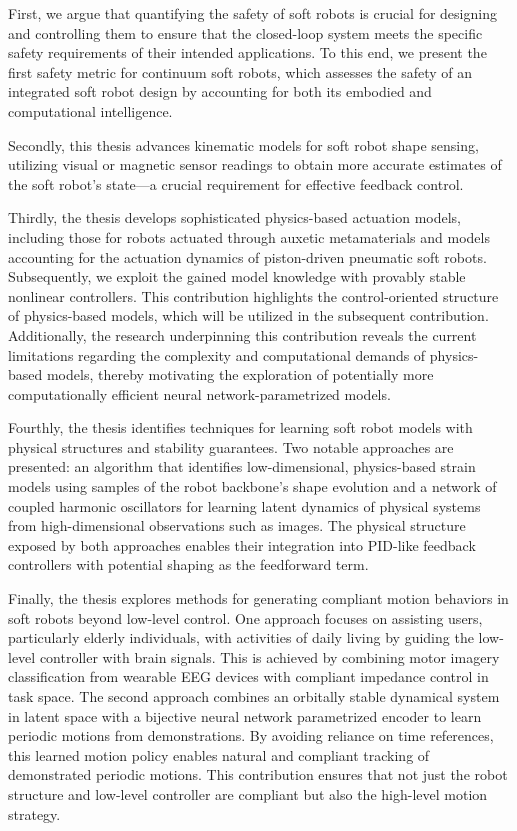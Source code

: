 First, we argue that quantifying the safety of soft robots is crucial for designing and controlling them to ensure that the closed-loop system meets the specific safety requirements of their intended applications. To this end, we present the first safety metric for continuum soft robots, which assesses the safety of an integrated soft robot design by accounting for both its embodied and computational intelligence.

Secondly, this thesis advances kinematic models for soft robot shape sensing, utilizing visual or magnetic sensor readings to obtain more accurate estimates of the soft robot's state—a crucial requirement for effective feedback control. 

Thirdly, the thesis develops sophisticated physics-based actuation models, including those for robots actuated through auxetic metamaterials and models accounting for the actuation dynamics of piston-driven pneumatic soft robots. Subsequently, we exploit the gained model knowledge with provably stable nonlinear controllers.
This contribution highlights the control-oriented structure of physics-based models, which will be utilized in the subsequent contribution. Additionally, the research underpinning this contribution reveals the current limitations regarding the complexity and computational demands of physics-based models, thereby motivating the exploration of potentially more computationally efficient neural network-parametrized models.

Fourthly, the thesis identifies techniques for learning soft robot models with physical structures and stability guarantees. Two notable approaches are presented: an algorithm that identifies low-dimensional, physics-based strain models using samples of the robot backbone's shape evolution and a network of coupled harmonic oscillators for learning latent dynamics of physical systems from high-dimensional observations such as images. The physical structure exposed by both approaches enables their integration into PID-like feedback controllers with potential shaping as the feedforward term.

Finally, the thesis explores methods for generating compliant motion behaviors in soft robots beyond low-level control. One approach focuses on assisting users, particularly elderly individuals, with activities of daily living by guiding the low-level controller with brain signals. This is achieved by combining motor imagery classification from wearable EEG devices with compliant impedance control in task space. The second approach combines an orbitally stable dynamical system in latent space with a bijective neural network parametrized encoder to learn periodic motions from demonstrations. By avoiding reliance on time references, this learned motion policy enables natural and compliant tracking of demonstrated periodic motions. This contribution ensures that not just the robot structure and low-level controller are compliant but also the high-level motion strategy.

